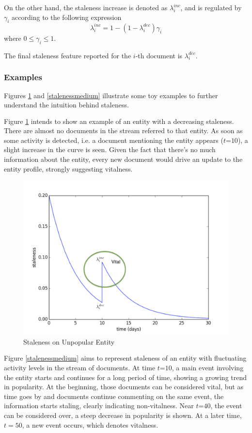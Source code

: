 \documentclass{article}
\begin{document}
On the other hand, the staleness increase is denoted as $\lambda^{inc}_i$, and is regulated by $\gamma_i$ according to the following expression
\begin{equation}
\lambda^{inc}_i = 1 - (1 - \lambda^{dec}_i) \gamma_i
\end{equation}
where $0 \leq \gamma_i \leq 1$.

The final staleness feature reported for the $i$-th document is $\lambda^{dec}_i$.

\subsubsection{Examples}

Figures \ref{stalenesslow} and \ref{stalenessmedium} illustrate some toy examples to further understand the intuition behind staleness.

Figure \ref{stalenesslow} intends to show an example of an entity with a decreasing staleness. There are almost no documents in the stream referred to that entity. As soon as some activity is detected, i.e. a document mentioning the entity appears ($t\mathord{=}10$), a slight increase in the curve is seen. Given the fact that there's no much information about the entity, every new document would drive an update to the entity profile, strongly suggesting vitalness.

\begin{figure}[h!]
\centering
\includegraphics[width=.5\textwidth]{staleness1.pdf}
\caption{Staleness on Unpopular Entity}
\label{stalenesslow}
\end{figure}

Figure \ref{stalenessmedium} aims to represent staleness of an entity with fluctuating activity levels in the stream of documents. At time $t\mathord{=}10$, a main event involving the entity starts and continues for a long period of time, showing a growing trend in popularity. 
At the beginning, those documents can be considered vital, but as time goes by and documents continue commenting on the same event, the information starts staling, clearly indicating non-vitalness.
Near $t\mathord{=}40$, the event can be considered over, a steep decrease in popularity is shown. At a later time, $t=50$, a new event occurs, which denotes vitalness.
\end{document}
